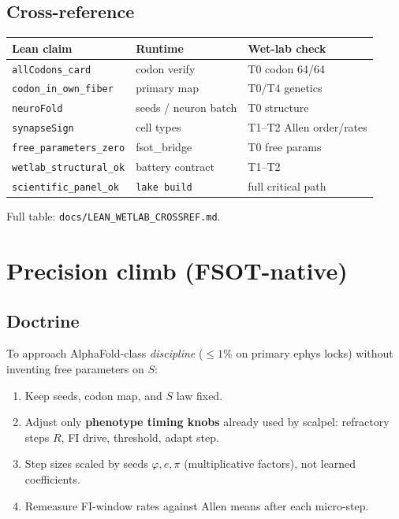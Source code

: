 \documentclass[11pt,a4paper]{article}
\begin{document}
\subsection{Cross-reference}
\begin{center}
\begin{tabular}{p{}p{}p{}}
\toprule
Lean claim & Runtime & Wet-lab check \\
\midrule
\texttt{allCodons\_card} & codon verify & T0 codon 64/64 \\
\texttt{codon\_in\_own\_fiber} & primary map & T0/T4 genetics \\
\texttt{neuroFold} & seeds / neuron batch & T0 structure \\
\texttt{synapseSign} & cell types & T1--T2 Allen order/rates \\
\texttt{free\_parameters\_zero} & fsot\_bridge & T0 free params \\
\texttt{wetlab\_structural\_ok} & battery contract & T1--T2 \\
\texttt{scientific\_panel\_ok} & \texttt{lake build} & full critical path \\
\bottomrule
\end{tabular}
\end{center}
Full table: \texttt{docs/LEAN\_WETLAB\_CROSSREF.md}.

\section{Precision climb (FSOT-native)}
\label{sec:precision}

\subsection{Doctrine}
To approach AlphaFold-class \emph{discipline} (\(\le 1\%\) on primary ephys locks)
without inventing free parameters on \(S\):
\begin{enumerate}[leftmargin=*]
  \item Keep seeds, codon map, and \(S\) law fixed.
  \item Adjust only \textbf{phenotype timing knobs} already used by scalpel:
        refractory steps \(R\), FI drive, threshold, adapt step.
  \item Step sizes scaled by seeds \(\varphi,e,\pi\) (multiplicative factors),
        not learned coefficients.
  \item Remeasure FI-window rates against Allen means after each micro-step.
\end{enumerate}
\end{document}

